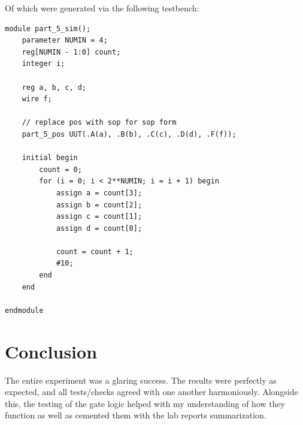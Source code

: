 Of which were generated via the following testbench:
\begin{lstlisting}[caption={Part 5 Testbench}, label={Part 5 Testbench}, style=Verilog]
module part_5_sim();
    parameter NUMIN = 4;
    reg[NUMIN - 1:0] count;
    integer i;
    
    reg a, b, c, d;
    wire f;

    // replace pos with sop for sop form
    part_5_pos UUT(.A(a), .B(b), .C(c), .D(d), .F(f)); 
    
    initial begin
        count = 0;
        for (i = 0; i < 2**NUMIN; i = i + 1) begin
            assign a = count[3];
            assign b = count[2];
            assign c = count[1];
            assign d = count[0];
            
            count = count + 1;
            #10;
        end
    end
    
endmodule
\end{lstlisting}\newpage
\section{Conclusion}
The entire experiment was a glaring success. The results were perfectly as expected, and all tests/checks agreed with one another harmoniously. Alongside this, the testing of the gate logic helped with my understanding of how they function as well as cemented them with the lab reports summarization.

